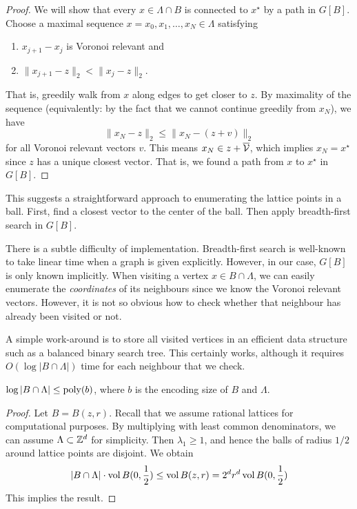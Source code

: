 \begin{proof}
  We will show that every $x \in \Lambda \cap B$ is connected to $x^\star$ by a path in $G[B]$.
  Choose a maximal sequence $x = x_0, x_1, \ldots, x_N \in \Lambda$ satisfying
  \begin{enumerate}
    \item $x_{j+1} - x_j$ is Voronoi relevant and
    \item $\|x_{j+1} - z\|_2 < \|x_j - z\|_2$.
  \end{enumerate}
  That is, greedily walk from $x$ along edges to get closer to $z$.
  By maximality of the sequence (equivalently: by the fact that we cannot continue greedily from $x_N$), we have
  \[
    \|x_N - z\|_2 \leq \|x_N - (z + v)\|_2
  \]
  for all Voronoi relevant vectors $v$.
  This means $x_N \in z + \overline{\mathcal{V}}$,
  which implies $x_N = x^\star$ since $z$ has a unique closest vector.
  That is, we found a path from $x$ to $x^\star$ in $G[B]$.
\end{proof}

This suggests a straightforward approach to enumerating the lattice points in a ball.
First, find a closest vector to the center of the ball.
Then apply breadth-first search in $G[B]$.

There is a subtle difficulty of implementation.
Breadth-first search is well-known to take linear time when a graph is given explicitly.
However, in our case, $G[B]$ is only known implicitly.
When visiting a vertex $x \in B \cap \Lambda$,
we can easily enumerate the \emph{coordinates} of its neighbours since we know the Voronoi relevant vectors.
However, it is not so obvious how to check whether that neighbour has already been visited or not.

A simple work-around is to store all visited vertices in an efficient data structure
such as a balanced binary search tree.
This certainly works,
although it requires $O(\log |B \cap \Lambda|)$ time for each neighbour that we check.

\begin{lemma}
  $\log |B \cap \Lambda| \leq \operatorname{poly}(b)$,
  where $b$ is the encoding size of $B$ and $\Lambda$.
\end{lemma}
\begin{proof}
  Let $B = B(z,r)$.
  Recall that we assume rational lattices for computational purposes.
  By multiplying with least common denominators, we can assume $\Lambda \subset \mathbb{Z}^d$ for simplicity.
  Then $\lambda_1 \geq 1$, and hence the balls of radius $1/2$ around lattice points are disjoint.
  We obtain
  \[
    |B \cap \Lambda| \cdot \operatorname{vol} B(0,\frac{1}{2}) \leq \operatorname{vol} B(z,r) = 2^d r^d \operatorname{vol} B(0,\frac{1}{2})
  \]
  This implies the result.
\end{proof}

